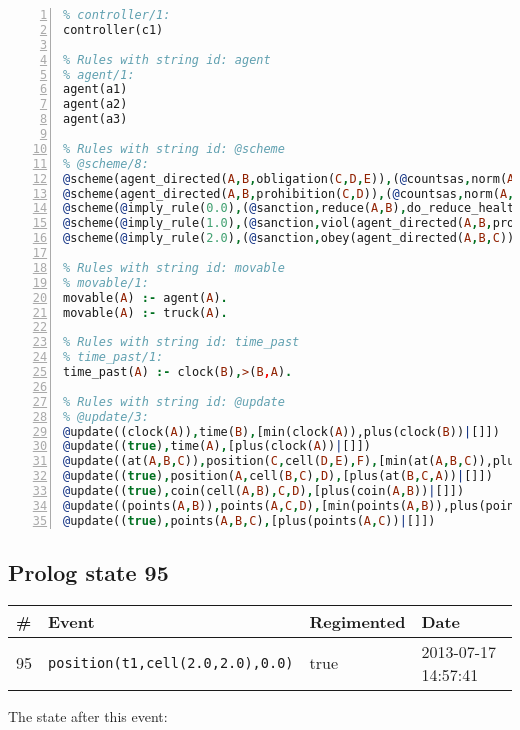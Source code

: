 \documentclass[11pt]{article}\usepackage[utf8]{inputenc}\usepackage{geometry}
\begin{document}
\begin{lstlisting}[language=Prolog, numbers=left]
% Rules with string id: controller
% controller/1:
controller(c1)

% Rules with string id: agent
% agent/1:
agent(a1)
agent(a2)
agent(a3)

% Rules with string id: @scheme
% @scheme/8:
@scheme(agent_directed(A,B,obligation(C,D,E)),(@countsas,norm(A,B,F,obligation(C,D,E)),F),false,(listTrue(C)),(time_past(D)),false,[plus(viol(agent_directed(A,B,obligation(C,D,E))))|[]],[plus(obey(agent_directed(A,B,obligation(C,D,E))))|[]])
@scheme(agent_directed(A,B,prohibition(C,D)),(@countsas,norm(A,B,E,prohibition(C,D)),E),(listTrue(C)),false,(false),false,[plus(viol(agent_directed(A,B,prohibition(C,D))))|[]],[plus(obey(agent_directed(A,B,prohibition(C,D))))|[]])
@scheme(@imply_rule(0.0),(@sanction,reduce(A,B),do_reduce_health(A,B),notifyAgent(A,changed(status))),true,false,false,false,[min(reduce(A,B))|[]],[])
@scheme(@imply_rule(1.0),(@sanction,viol(agent_directed(A,B,prohibition(C,D))),do_sanction(D)),true,false,false,false,[min(viol(agent_directed(A,B,prohibition(C,D))))|[]],[])
@scheme(@imply_rule(2.0),(@sanction,obey(agent_directed(A,B,C))),true,false,false,false,[min(obey(agent_directed(A,B,C)))|[]],[])

% Rules with string id: movable
% movable/1:
movable(A) :- agent(A).
movable(A) :- truck(A).

% Rules with string id: time_past
% time_past/1:
time_past(A) :- clock(B),>(B,A).

% Rules with string id: @update
% @update/3:
@update((clock(A)),time(B),[min(clock(A)),plus(clock(B))|[]])
@update((true),time(A),[plus(clock(A))|[]])
@update((at(A,B,C)),position(C,cell(D,E),F),[min(at(A,B,C)),plus(at(D,E,C))|[]])
@update((true),position(A,cell(B,C),D),[plus(at(B,C,A))|[]])
@update((true),coin(cell(A,B),C,D),[plus(coin(A,B))|[]])
@update((points(A,B)),points(A,C,D),[min(points(A,B)),plus(points(A,D))|[]])
@update((true),points(A,B,C),[plus(points(A,C))|[]])

\end{lstlisting}
\clearpage 
\subsection{Prolog state 95}
\begin{table}[ht]
\centering 
\begin{tabular}{l l l l} 
\textbf{\#} & \textbf{Event} & \textbf{Regimented} & \textbf{Date} \\ [0.5ex] 
\hline
95&\texttt{position(t1,cell(2.0,2.0),0.0)}&true&2013-07-17 14:57:41\\ [1ex] \hline\end{tabular}
\end{table}
The state after this event:
\end{document}
